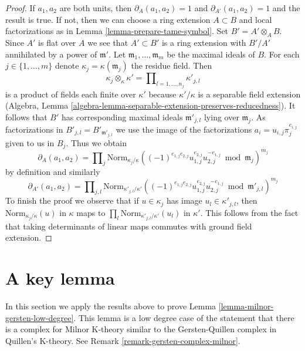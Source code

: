 \begin{proof}
If $a_1, a_2$ are both units, then $\partial_A(a_1, a_2) = 1$
and $\partial_{A'}(a_1, a_2) = 1$ and the result is true.
If not, then we can choose a ring extension $A \subset B$ and
local factorizations as in Lemma \ref{lemma-prepare-tame-symbol}.
Set $B' = A' \otimes_A B$. Since $A'$ is flat over $A$ we see
that $A' \subset B'$ is a ring extension with $B'/A'$ annihilated
by a power of $\mathfrak m'$. Let $\mathfrak m_1, \ldots, \mathfrak m_m$
be the maximal ideals of $B$. For each $j \in \{1, \ldots, m\}$
denote $\kappa_j = \kappa(\mathfrak m_j)$ the residue field.
Then
$$
\kappa_j \otimes_\kappa \kappa' =
\prod\nolimits_{l = 1, \ldots, n_j} \kappa'_{j, l}
$$
is a product of fields each finite over $\kappa'$ because $\kappa'/\kappa$
is a separable field extension
(Algebra, Lemma \ref{algebra-lemma-separable-extension-preserves-reducedness}).
It follows that $B'$ has corresponding maximal ideals $\mathfrak m'_{j, l}$
lying over $\mathfrak m_j$. As factorizations in
$B'_{j, l} = B'_{\mathfrak m'_{j, l}}$ we use the image of the factorizations
$a_i = u_{i, j} \pi_j^{e_{i, j}}$ given to us in $B_j$.
Thus we obtain
$$
\partial_A(a_1, a_2) = \prod\nolimits_j
\text{Norm}_{\kappa_j/\kappa}
((-1)^{e_{1, j}e_{2, j}}u_{1, j}^{e_{2, j}}u_{2, j}^{-e_{1, j}}
\bmod \mathfrak m_j)^{m_j}
$$
by definition and similarly
$$
\partial_{A'}(a_1, a_2) = \prod\nolimits_{j, l}
\text{Norm}_{\kappa'_{j, l}/\kappa'}
((-1)^{e_{1, j}e_{2, j}}u_{1, j}^{e_{2, j}}u_{2, j}^{-e_{1, j}}
\bmod \mathfrak m'_{j, l})^{m_j}
$$
To finish the proof we observe that if $u \in \kappa_j$
has image $u_l \in \kappa'_{j, l}$, then
$\text{Norm}_{\kappa_j/\kappa}(u)$ in $\kappa$ maps to
$\prod_l \text{Norm}_{\kappa'_{j, l}/\kappa'}(u_l)$ in $\kappa'$.
This follows from the fact that taking determinants of linear
maps commutes with ground field extension.
\end{proof}






\section{A key lemma}
\label{section-key-lemma}

\noindent
In this section we apply the results above to prove
Lemma \ref{lemma-milnor-gersten-low-degree}.
This lemma is a low degree case of the statement
that there is a complex for Milnor K-theory similar
to the Gersten-Quillen complex in Quillen's K-theory.
See Remark \ref{remark-gersten-complex-milnor}.

